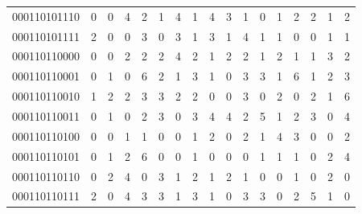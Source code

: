 \documentclass[10pt,a4paper]{article}
\begin{document}
\begin{longtable}{ |c|c|c|c|c|c|c|c|c|c|c|c|c|c|c|c|c| }
    000110101110              & 0                            & 0                                & 4                            & 2                              & 1   & 4   & 1   & 4   & 3   & 1   & 0   & 1   & 2   & 2   & 1   & 2   \\
    000110101111              & 2                            & 0                                & 0                            & 3                              & 0   & 3   & 1   & 3   & 1   & 4   & 1   & 1   & 0   & 0   & 1   & 1   \\
    000110110000              & 0                            & 0                                & 2                            & 2                              & 2   & 4   & 2   & 1   & 2   & 2   & 1   & 2   & 1   & 1   & 3   & 2   \\
    000110110001              & 0                            & 1                                & 0                            & 6                              & 2   & 1   & 3   & 1   & 0   & 3   & 3   & 1   & 6   & 1   & 2   & 3   \\
    000110110010              & 1                            & 2                                & 2                            & 3                              & 3   & 2   & 2   & 0   & 0   & 3   & 0   & 2   & 0   & 2   & 1   & 6   \\
    000110110011              & 0                            & 1                                & 0                            & 2                              & 3   & 0   & 3   & 4   & 4   & 2   & 5   & 1   & 2   & 3   & 0   & 4   \\
    000110110100              & 0                            & 0                                & 1                            & 1                              & 0   & 0   & 1   & 2   & 0   & 2   & 1   & 4   & 3   & 0   & 0   & 2   \\
    000110110101              & 0                            & 1                                & 2                            & 6                              & 0   & 0   & 1   & 0   & 0   & 0   & 1   & 1   & 1   & 0   & 2   & 4   \\
    000110110110              & 0                            & 2                                & 4                            & 0                              & 3   & 1   & 2   & 1   & 2   & 1   & 0   & 0   & 1   & 0   & 2   & 0   \\
    000110110111              & 2                            & 0                                & 4                            & 3                              & 3   & 1   & 3   & 1   & 0   & 3   & 3   & 0   & 2   & 5   & 1   & 0   \\

\end{longtable}
\end{document}
